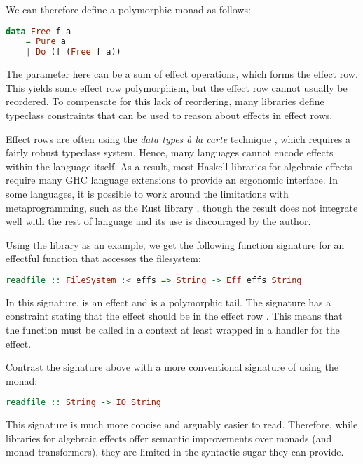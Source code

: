 We can therefore define a polymorphic  monad as follows:
\begin{lstlisting}[language=haskell]
data Free f a
    = Pure a
    | Do (f (Free f a))
\end{lstlisting}
The parameter  here can be a sum of effect operations, which forms the effect row. This yields some effect row polymorphism, but the effect row cannot usually be reordered. To compensate for this lack of reordering, many libraries define typeclass constraints that can be used to reason about effects in effect rows.

Effect rows are often using the \emph{data types à la carte} technique \autocite{swierstra_data_2008}, which requires a fairly robust typeclass system. Hence, many languages cannot encode effects within the language itself. As a result, most Haskell libraries for algebraic effects require many GHC language extensions to provide an ergonomic interface. In some languages, it is possible to work around the limitations with metaprogramming, such as the Rust library , though the result does not integrate well with the rest of language and its use is discouraged by the author.

Using the  library as an example, we get the following function signature for an effectful function that accesses the filesystem:
\begin{lstlisting}[language=Haskell,style=fancy]
readfile :: FileSystem :< effs => String -> Eff effs String
\end{lstlisting}
In this signature,  is an effect and  is a polymorphic tail. The signature has a constraint stating that the  effect should be in the effect row . This means that the  function must be called in a context at least wrapped in a handler for the  effect.

Contrast the signature above with a more conventional signature of  using the  monad:
\begin{lstlisting}[language=Haskell,style=fancy]
readfile :: String -> IO String
\end{lstlisting}
This signature is much more concise and arguably easier to read. Therefore, while libraries for algebraic effects offer semantic improvements over monads (and monad transformers), they are limited in the syntactic sugar they can provide.

